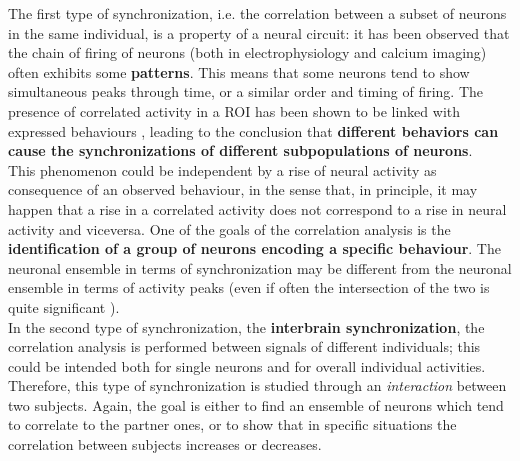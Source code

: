 \documentclass[12pt, a4paper]{report}
\begin{document}
The first type of synchronization, i.e. the correlation between a subset of neurons in the same individual, is a property of a neural circuit: it has been observed that the chain of firing of neurons (both in electrophysiology and calcium imaging) often exhibits some \textbf{patterns}. This means that some neurons tend to show simultaneous peaks through time, or a similar order and timing of firing. The presence of correlated activity in a ROI has been shown to be linked with expressed behaviours \cite{13}, %
leading to the conclusion that \textbf{different behaviors can cause the synchronizations of different  subpopulations of neurons}.\\
This phenomenon could be independent by a rise of neural activity as consequence of an observed behaviour, in the sense that, in principle, it may happen that a rise in a correlated activity does not correspond to a rise in neural activity and viceversa. One of the goals of the correlation analysis is the \textbf{identification of a group of neurons encoding a specific behaviour}. The neuronal ensemble in terms of synchronization may be different from the neuronal ensemble in terms of activity peaks (even if often the intersection of the two is quite significant \cite{8}).\\
In the second type of synchronization, the \textbf{interbrain synchronization}, the correlation analysis is performed between signals of different individuals; this could be intended both for single neurons and for  overall individual activities. Therefore, this type of synchronization is studied through an \textit{interaction} between two subjects. Again, the goal is either to find an ensemble of neurons which tend to correlate to the partner ones, or to show that in specific situations the correlation between subjects increases or decreases.\\
\end{document}
